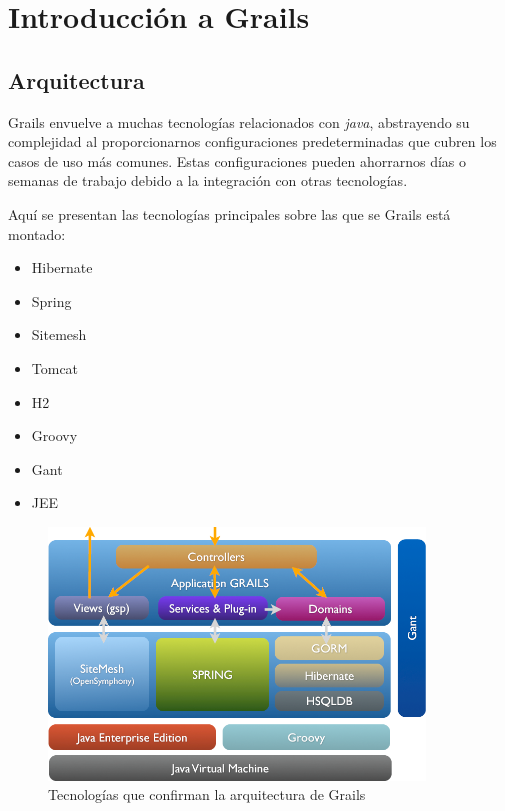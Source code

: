 \chapter{Introducci\'on a Grails}
\section{Arquitectura}
Grails envuelve a muchas tecnolog\'ias relacionados con \textit{java}, abstrayendo su complejidad al proporcionarnos configuraciones predeterminadas que cubren los casos de uso m\'as comunes. Estas configuraciones pueden ahorrarnos d\'ias o semanas de trabajo debido a la integraci\'on con otras tecnolog\'ias.

Aqu\'i se presentan las tecnolog\'ias principales sobre las que se Grails est\'a montado:

\begin{multicols}{2}
\begin{itemize}
  \item Hibernate
  \item Spring
  \item Sitemesh
  \item Tomcat
  \item H2
  \item Groovy
  \item Gant
  \item JEE
\end{itemize}
\end{multicols}

\begin{figure}[ht!]

    \includegraphics[width=100mm]{img/arch}
    \caption{Tecnolog\'ias que confirman la arquitectura de Grails}
    \label{arquitectura}

\end{figure}


